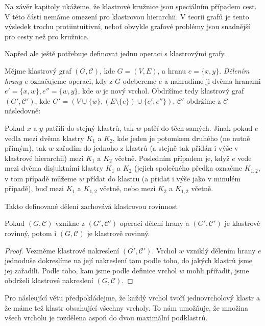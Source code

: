 Na závěr kapitoly ukážeme, že klastrové kružnice jsou speciálním případem cest. V této části nemáme omezení pro klastrovou hierarchii. V teorii grafů je tento výsledek trochu protiintuitivní, neboť obvykle grafové problémy jsou snadnější pro cesty než pro kružnice. 

Napřed ale ještě potřebuje definovat jednu operaci s klastrovými grafy.

\begin{defn}Mějme klastrový graf $(G, \mathcal C)$, kde $G=(V,E)$, a hranu $e=\{x,y\}$. \textit{Dělením hrany $e$} označujeme operaci, kdy z $G$ odebereme $e$ a nahradíme ji dvěma hranami $e'=\{x,w\}, e''=\{w,y\}$, kde $w$ je nový vrchol. Obdržíme tedy klastrový graf $(G', \mathcal C')$, kde $G'=(V \cup \{w\},(E \setminus \{e\}) \cup \{e',e''\})$. $\mathcal C'$ obdržíme z $\mathcal C$ následovně:

Pokud $x$ a $y$ patřili do stejný klastrů, tak $w$ patří do těch samých. Jinak pokud $e$ vedla mezi dvěma klastry $K_1$ a $K_2$, kde jeden je potomkem druhého (ne nutně přímým), tak $w$ zařadím do jednoho z klastrů (a stejně tak přidán i výše v klastrové hierarchii) mezi $K_1$ a $K_2$ včetně. Posledním případem je, když $e$ vede mezi dvěma disjuktními klastry $K_1$ a $K_2$ (jejich společného předka označme $K_{1,2}$, v tom případě můžeme $w$ přídat do klastru (a přidat i výše jako v minulém případě), buď mezi $K_1$ a $K_{1,2}$ včetně, nebo  mezi $K_2$ a $K_{1,2}$ včetně.
\end{defn}

Takto definované dělení zachovává klastrovou rovinnost

\begin{lemma}
Pokud $(G, \mathcal C)$ vznikne z $(G', \mathcal C')$ operací dělení hrany a $(G', \mathcal C')$ je klastrově rovinný, potom i $(G, \mathcal C)$ je klastrově rovinný.
\end{lemma}
\begin{proof}
Vezměme klastrové nakreslení $(G', \mathcal C')$. Vrchol $w$ vzniklý dělením hrany $e$ jednoduše dokreslíme na její nakreslení tam podle toho, do jakých klastrů jsme jej zařadili. Podle toho, kam jsme podle definice vrchol $w$ mohli přiřadit, jsme obdrželi klastrové nakreslení $(G, \mathcal C)$.
\end{proof}

Pro násleující větu předpokládejme, že každý vrchol tvoří jednovrcholový klastr a že máme tež klastr obsahující všechny vrcholy. To nám umožňuje, že množina všech vrcholu je rozdělena aspoň do dvou maximální podklastrů.

